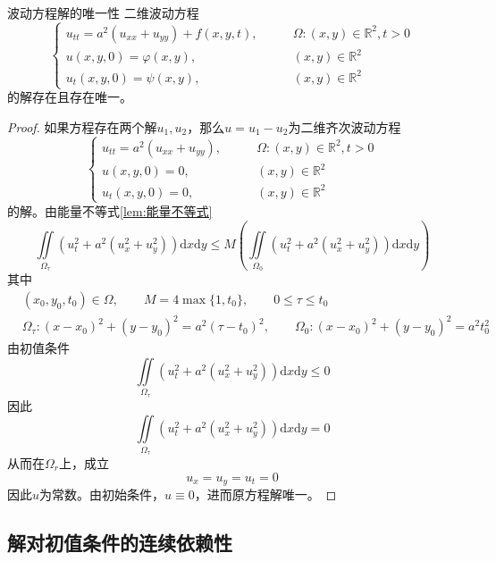 \documentclass[lang = cn, scheme = chinese, thmcnt = section]{elegantbook}
\newcommand{\R}{\mathbb{R}}            %
\newcommand{\dd}{\mathrm{d}}           %
\newcommand{\IInt}{\iint\limits}
\begin{document}
\begin{theorem}{波动方程解的唯一性}
	二维波动方程
	$$
	\begin{cases}
		u_{tt}=a^2(u_{xx}+u_{yy})+f(x,y,t),\qquad & \Omega:(x,y)\in \R^2,t>0\\
		u(x,y,0)=\varphi(x,y),\qquad & (x,y)\in \R^2\\
		u_t(x,y,0)=\psi(x,y),\qquad & (x,y)\in \R^2
	\end{cases}
	$$
	的解存在且存在唯一。
\end{theorem}

\begin{proof}
	如果方程存在两个解$u_1,u_2$，那么$u=u_1-u_2$为二维齐次波动方程
	$$
	\begin{cases}
		u_{tt}=a^2(u_{xx}+u_{yy}),\qquad & \Omega:(x,y)\in \R^2,t>0\\
		u(x,y,0)=0,\qquad & (x,y)\in \R^2\\
		u_t(x,y,0)=0,\qquad & (x,y)\in \R^2
	\end{cases}
	$$
	的解。由能量不等式\ref{lem:能量不等式}
	$$
	\IInt_{\Omega_\tau}\left(u_{t}^2+a^2\left(u_x^2+u_y^2\right)\right)\dd x\dd y
	\le
	M\left( 
	\IInt_{\Omega_0}\left(u_{t}^2+a^2\left(u_x^2+u_y^2\right)\right)\dd x\dd y
	\right)
	$$
	其中
	\begin{align*}
		& (x_0,y_0,t_0)\in\Omega,\qquad 
		M=4\max\{ 1,t_0 \},\qquad
		0\le \tau \le t_0\\
		& \Omega_\tau:(x-x_0)^2+(y-y_0)^2= a^2(\tau-t_0)^2,\qquad
		\Omega_0:(x-x_0)^2+(y-y_0)^2= a^2t_0^2
	\end{align*}
	由初值条件
	$$
	\IInt_{\Omega_\tau}\left(u_{t}^2+a^2\left(u_x^2+u_y^2\right)\right)\dd x\dd y
	\le0
	$$
	因此%
	$$
	\IInt_{\Omega_\tau}\left(u_{t}^2+a^2\left(u_x^2+u_y^2\right)\right)\dd x\dd y=0
	$$
	从而在$\Omega_r$上，成立%
	$$
	u_x=u_y=u_t=0
	$$
	因此$u$为常数。由初始条件，$u\equiv0$，进而原方程解唯一。
\end{proof}

\subsection{解对初值条件的连续依赖性}
\end{document}
